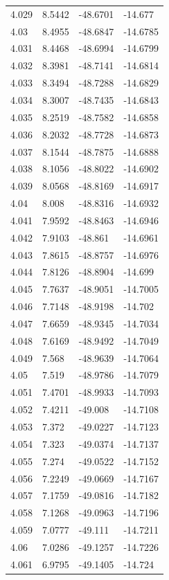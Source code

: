 \begin{tabular}{llll}
4.029 & 8.5442 & -48.6701 & -14.677 \\
4.03 & 8.4955 & -48.6847 & -14.6785 \\
4.031 & 8.4468 & -48.6994 & -14.6799 \\
4.032 & 8.3981 & -48.7141 & -14.6814 \\
4.033 & 8.3494 & -48.7288 & -14.6829 \\
4.034 & 8.3007 & -48.7435 & -14.6843 \\
4.035 & 8.2519 & -48.7582 & -14.6858 \\
4.036 & 8.2032 & -48.7728 & -14.6873 \\
4.037 & 8.1544 & -48.7875 & -14.6888 \\
4.038 & 8.1056 & -48.8022 & -14.6902 \\
4.039 & 8.0568 & -48.8169 & -14.6917 \\
4.04 & 8.008 & -48.8316 & -14.6932 \\
4.041 & 7.9592 & -48.8463 & -14.6946 \\
4.042 & 7.9103 & -48.861 & -14.6961 \\
4.043 & 7.8615 & -48.8757 & -14.6976 \\
4.044 & 7.8126 & -48.8904 & -14.699 \\
4.045 & 7.7637 & -48.9051 & -14.7005 \\
4.046 & 7.7148 & -48.9198 & -14.702 \\
4.047 & 7.6659 & -48.9345 & -14.7034 \\
4.048 & 7.6169 & -48.9492 & -14.7049 \\
4.049 & 7.568 & -48.9639 & -14.7064 \\
4.05 & 7.519 & -48.9786 & -14.7079 \\
4.051 & 7.4701 & -48.9933 & -14.7093 \\
4.052 & 7.4211 & -49.008 & -14.7108 \\
4.053 & 7.372 & -49.0227 & -14.7123 \\
4.054 & 7.323 & -49.0374 & -14.7137 \\
4.055 & 7.274 & -49.0522 & -14.7152 \\
4.056 & 7.2249 & -49.0669 & -14.7167 \\
4.057 & 7.1759 & -49.0816 & -14.7182 \\
4.058 & 7.1268 & -49.0963 & -14.7196 \\
4.059 & 7.0777 & -49.111 & -14.7211 \\
4.06 & 7.0286 & -49.1257 & -14.7226 \\
4.061 & 6.9795 & -49.1405 & -14.724 \\

\end{tabular}
